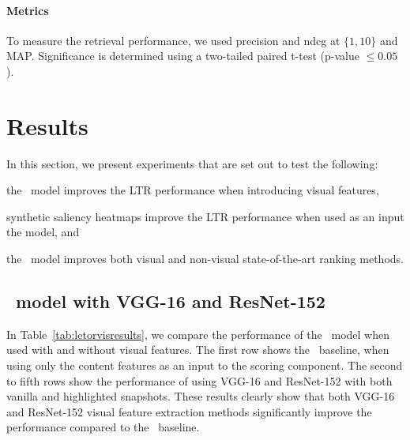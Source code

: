 \paragraph{Metrics}
To measure the retrieval performance, we used precision and ndcg at $\{1,10\}$ and MAP.
Significance is determined using a two-tailed paired t-test (p-value $\leq 0.05$). 




\section{Results}
In this section, we present experiments that are set out to test the following:
\begin{inparaenum}[(i)]
    \item the \modelname~model improves the \ac{LTR} performance when introducing visual features, 
    \item synthetic saliency heatmaps improve the \ac{LTR} performance when used as an input the \modelname{} model, and
    \item the \modelname~model improves both visual and non-visual state-of-the-art ranking methods.
\end{inparaenum}

\subsection{\modelname~model with VGG-16 and ResNet-152}
In Table~\ref{tab:letorvisresults}, we compare the performance of the \modelname~model when used with and without visual features.
The first row shows the \modelname~baseline, when using only the content features as an input to the scoring component.
The second to fifth rows show the performance of using VGG-16 and ResNet-152 with both vanilla and highlighted snapshots. 
These results clearly show that both VGG-16 and ResNet-152 visual feature extraction methods significantly improve the performance compared to the \modelname~baseline. 

